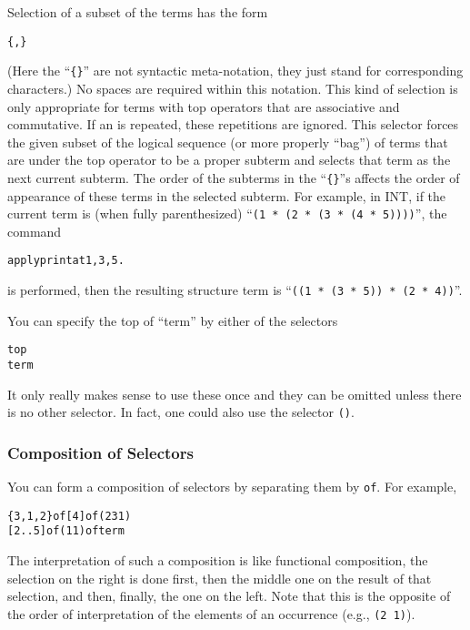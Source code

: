 Selection of a subset of the terms has the form
\begin{alltt}
        \{  \lopt,  \ropt\itr \}
\end{alltt}
(Here the ``{\tt \{\}}'' are not syntactic meta-notation, they just
stand for corresponding characters.)  No spaces are required within
this notation.  This kind of selection is only appropriate for terms
with top operators that are associative and commutative.  If an
 is repeated, these repetitions are ignored.  This selector
forces the given subset of the logical sequence (or more properly
``bag'') of terms that are under the top operator to be a proper
subterm and selects that term as the next current subterm.  The order
of the subterms in the ``{\tt \{\}}''s affects the order of appearance
of these terms in the selected subterm.  For example, in INT, if the
current term is (when fully parenthesized) ``{\tt (1 * (2 * (3 * (4 *
  5))))}'', the command
\begin{alltt}
    apply print at {1,3,5} .
\end{alltt}
is performed, then the resulting structure term is
``{\tt ((1 * (3 * 5)) * (2 * 4))}''.

You can specify the top of ``term'' by either of the selectors
\begin{alltt}
        top
        term
\end{alltt}
It only really makes sense to use these once and they can be omitted
unless there is no other selector.  In fact, one could also use the
selector {\tt ()}.

\subsubsection{Composition of Selectors}
You can form a composition of selectors by separating them by
{\tt of}.  For example,
\begin{alltt}
        \{3,1,2\} of [4] of (2 3 1)
        [2 .. 5] of (1 1) of term
\end{alltt}
The interpretation of such a composition is like functional
composition, the selection on the right is done first, then the middle
one on the result of that selection, and then, finally, the one on the
left.  Note that this is the opposite of the order of interpretation
of the elements of an occurrence (e.g., {\tt (2 1)}).

